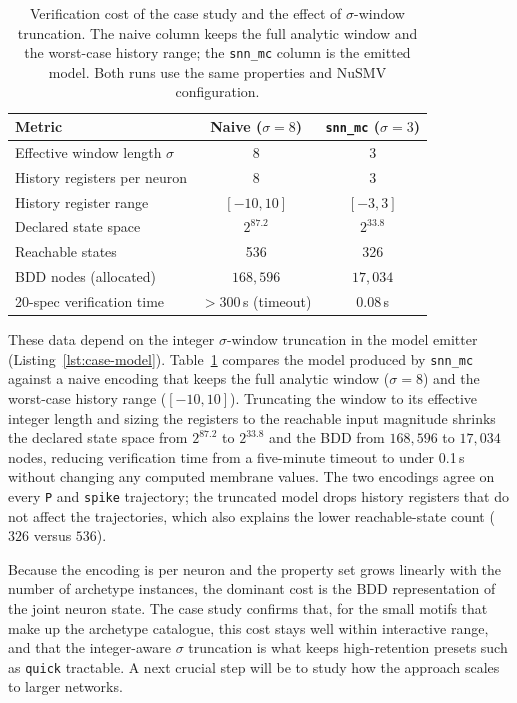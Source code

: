 \documentclass[
]{ceurart}
\begin{document}
\FloatBarrier
\begin{table}[!ht]
\centering
\caption{Verification cost of the case study and the effect of $\sigma$-window truncation. The naive column keeps the full analytic window and the worst-case history range; the \texttt{snn\_mc} column is the emitted model. Both runs use the same properties and NuSMV configuration.}
\label{tab:case-eval}
\small
\begin{tabular}{@{}lcc@{}}
\toprule
\textbf{Metric} & \textbf{Naive ($\sigma{=}8$)} & \textbf{\texttt{snn\_mc} ($\sigma{=}3$)} \\
\midrule
Effective window length $\sigma$        & 8            & 3 \\
History registers per neuron            & 8            & 3 \\
History register range                  & $[-10,10]$   & $[-3,3]$ \\
Declared state space                    & $2^{87.2}$   & $2^{33.8}$ \\
Reachable states                        & 536          & 326 \\
BDD nodes (allocated)                    & $168{,}596$  & $17{,}034$ \\
20-spec verification time               & $>300$\,s (timeout) & $0.08$\,s \\
\bottomrule
\end{tabular}
\end{table}
\FloatBarrier

These data depend on the integer $\sigma$-window truncation in the model
emitter (Listing~\ref{lst:case-model}). Table~\ref{tab:case-eval} compares
the model produced by \texttt{snn\_mc} against a naive encoding that keeps
the full analytic window ($\sigma = 8$) and the worst-case history range
($[-10,10]$). Truncating the window to its effective integer length and
sizing the registers to the reachable input magnitude shrinks the declared
state space from $2^{87.2}$ to $2^{33.8}$ and the BDD from $168{,}596$ to
$17{,}034$ nodes, reducing verification time from a five-minute timeout to
under 0.1\,s without changing any computed membrane values. The two encodings
agree on every \texttt{P} and \texttt{spike} trajectory; the truncated model
drops history registers that do not affect the trajectories, which also
explains the lower reachable-state count ($326$ versus $536$).


Because the encoding is per neuron and the property set grows linearly with
the number of archetype instances, the dominant cost is the BDD
representation of the joint neuron state. The case study confirms that, for
the small motifs that make up the archetype catalogue, this cost stays well
within interactive range, and that the integer-aware $\sigma$ truncation is
what keeps high-retention presets such as \texttt{quick} tractable.
A next crucial step will be to study how the approach scales to larger
networks.
\end{document}
